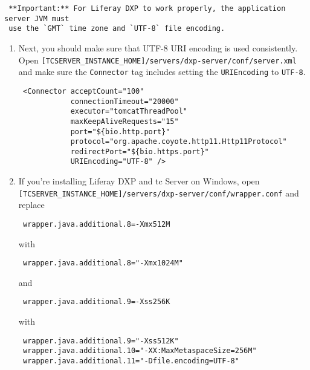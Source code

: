 \noindent\hrulefill

\begin{verbatim}
 **Important:** For Liferay DXP to work properly, the application server JVM must
 use the `GMT` time zone and `UTF-8` file encoding.
\end{verbatim}

\noindent\hrulefill

\begin{enumerate}
\def\labelenumi{\arabic{enumi}.}
\setcounter{enumi}{1}
\item
  Next, you should make sure that UTF-8 URI encoding is used
  consistently. Open
  \texttt{{[}TCSERVER\_INSTANCE\_HOME{]}/servers/dxp-server/conf/server.xml}
  and make sure the \texttt{Connector} tag includes setting the
  \texttt{URIEncoding} to \texttt{UTF-8}.

\begin{verbatim}
 <Connector acceptCount="100"
            connectionTimeout="20000"
            executor="tomcatThreadPool"
            maxKeepAliveRequests="15"
            port="${bio.http.port}"
            protocol="org.apache.coyote.http11.Http11Protocol"
            redirectPort="${bio.https.port}"
            URIEncoding="UTF-8" />
\end{verbatim}
\item
  If you're installing Liferay DXP and tc Server on Windows, open
  \texttt{{[}TCSERVER\_INSTANCE\_HOME{]}/servers/dxp-server/conf/wrapper.conf}
  and replace

\begin{verbatim}
 wrapper.java.additional.8=-Xmx512M
\end{verbatim}

  with

\begin{verbatim}
 wrapper.java.additional.8="-Xmx1024M"
\end{verbatim}

  and

\begin{verbatim}
 wrapper.java.additional.9=-Xss256K
\end{verbatim}

  with

\begin{verbatim}
 wrapper.java.additional.9="-Xss512K"
 wrapper.java.additional.10="-XX:MaxMetaspaceSize=256M"
 wrapper.java.additional.11="-Dfile.encoding=UTF-8"
\end{verbatim}
\end{enumerate}

